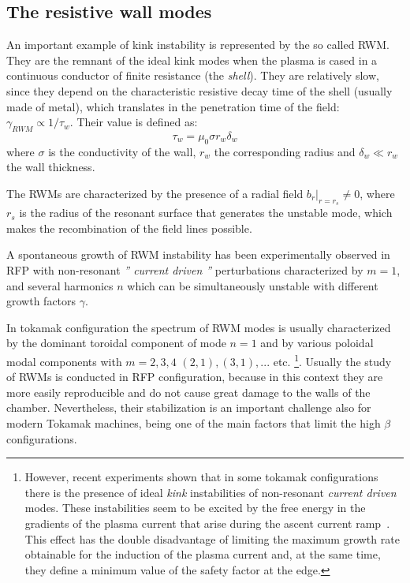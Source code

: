 \subsection{The resistive wall modes}

An important example of kink instability is represented by the so called \ac{RWM}. They are the remnant of the ideal kink modes when the plasma is cased in a continuous conductor of finite resistance (the \emph{shell}). They are relatively slow, since they depend on the characteristic resistive decay time of the shell (usually made of metal), which translates in the penetration time of the field: $\gamma_{RWM} \propto 1/\tau_w$. Their value is defined as:
%
\begin{equation}
 \tau_w = \mu_0 \sigma r_w \delta_w
\end{equation}
%
where $\sigma$ is the conductivity of the wall, $ r_w $ the corresponding radius and $\delta_w \ll r_w$ the wall thickness. 

The \acs{RWM}s are characterized by the presence of a radial field $b_r|_{r=r_s} \neq 0$, where $ r_s $ is the radius of the resonant surface that generates the unstable mode, which makes the recombination of the field lines possible.

A spontaneous growth of \acs{RWM} instability has been experimentally observed in \acs{RFP} with non-resonant \emph{'' current driven ''} perturbations characterized by $ m = 1 $, and several harmonics $ n $ which can be simultaneously unstable with different growth factors $\gamma$\cite{pizz46}\cite{pizz47}\cite{gregoratto}.

In tokamak configuration the spectrum of RWM modes is usually characterized by the dominant toroidal component of mode $ n = 1 $ and by various poloidal modal components with $m=2,3,4$ $(2,1),(3,1),... $ etc.
\footnote{
However, recent experiments shown that in some tokamak configurations there is the presence of ideal \textit{kink} instabilities of non-resonant \emph{current driven} modes. These instabilities seem to be excited by the free energy in the gradients of the plasma current that arise during the ascent current ramp~\cite{baruzzo9, baruzzo10, baruzzo11}. This effect has the double disadvantage of limiting the maximum growth rate obtainable for the induction of the plasma current and, at the same time, they define a minimum value of the safety factor at the edge.}.
%
Usually the study of \acs{RWM}s is conducted in \acs{RFP} configuration, because in this context they are more easily reproducible and do not cause great damage to the walls of the chamber. Nevertheless, their stabilization is an important challenge also for modern Tokamak machines, being one of the main factors that limit the high $\beta$ configurations.


